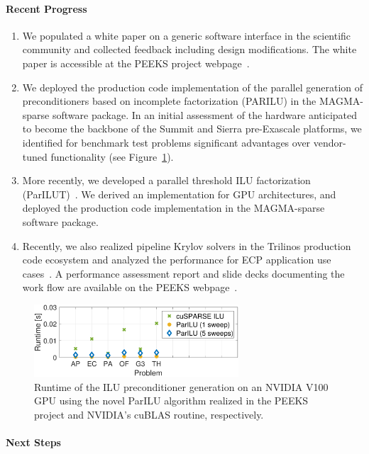 \paragraph{Recent Progress}
\begin{enumerate}
\item
We populated a white paper on a generic software interface in the scientific 
community and collected feedback including design modifications. The white paper 
is accessible at the PEEKS project webpage~\cite{peekswebpage}.
\item 
We deployed the production code implementation of the parallel 
generation of preconditioners based on incomplete factorization (PARILU) in the 
MAGMA-sparse software package. In an 
initial assessment of the hardware anticipated to become the backbone of the 
Summit and Sierra pre-Exascale platforms, we identified for benchmark test 
problems significant advantages over vendor-tuned functionality (see 
Figure~\ref{fig:ILUperf}).
\item
More recently, we developed a parallel threshold ILU factorization 
(ParILUT)~\cite{doi:10.1137/16M1079506}. We derived an implementation for GPU 
architectures, and deployed the production code implementation in the 
MAGMA-sparse software package.
\item 
Recently, we also realized pipeline Krylov solvers in the Trilinos 
production code ecosystem and analyzed the performance for ECP application use 
cases~\cite{1204}. A performance assessment report and slide decks documenting 
the work flow are available on the PEEKS 
webpage~\cite{peekswebpage}. 
\end{enumerate}

\begin{figure}[htb]
	\centering
	\includegraphics[width=3in]{projects/2.3.3-MathLibs/2.3.3.10-PEEKS/runtime2}
	\caption{\label{fig:ILUperf}Runtime of the ILU preconditioner generation on 
	an NVIDIA V100 GPU using the novel ParILU algorithm realized in the PEEKS 
	project and NVIDIA's cuBLAS routine, respectively.}
\end{figure}


\paragraph{Next Steps}


